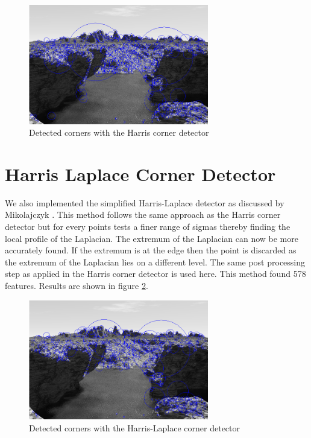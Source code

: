\documentclass{article}
\begin{document}
\begin{figure}[ht]
\centering
\includegraphics[width=0.7\textwidth]{img/Harris.png}
\caption{Detected corners with the Harris corner detector}
\label{fig:Harris}
\end{figure}

\section{Harris Laplace Corner Detector}

We also implemented the simplified Harris-Laplace detector as discussed by Mikolajczyk \cite{Miko}. This method follows the same approach as the Harris corner detector but for every points tests a finer range of sigmas thereby finding the local profile of the Laplacian. The extremum of the Laplacian can now be more accurately found. If the extremum is at the edge then the point is discarded as the extremum of the Laplacian lies on a different level. The same post processing step as applied in the Harris corner detector is used here. This method found 578 features. Results are shown in figure \ref{fig:HL}.


\begin{figure}[ht]
\centering
\includegraphics[width=0.7\textwidth]{img/HarrisLaplace.png}
\caption{Detected corners with the Harris-Laplace corner detector}
\label{fig:HL}
\end{figure}
\end{document}
